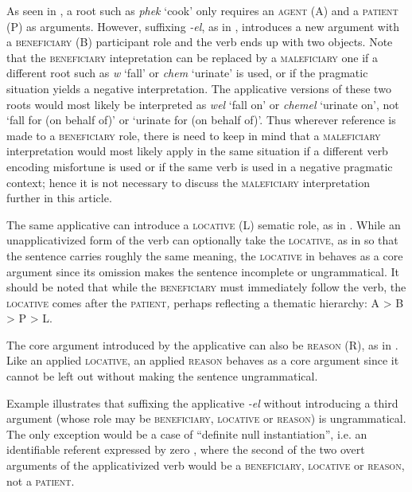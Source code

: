 \documentclass[output=paper]{langsci/langscibook}
\begin{document}
As seen in , a root such as \textit{phek} ‘cook’ only requires an \textsc{agent} (A) and a \textsc{patient} (P) as arguments. However, suffixing \textit{-el}, as in , introduces a new argument with a \textsc{beneficiary} (B) participant role and the verb ends up with two objects. Note that the \textsc{beneficiary} intepretation can be replaced by a \textsc{maleficiary} one if a different root such as \textit{w} ‘fall’ or \textit{chem} ‘urinate’ is used, or if the pragmatic situation yields a negative interpretation. The applicative versions of these two roots would most likely be interpreted as \textit{wel} ‘fall on’ or \textit{chemel} ‘urinate on’, not ‘fall for (on behalf of)’ or ‘urinate for (on behalf of)’. Thus wherever reference is made to a \textsc{beneficiary} role, there is need to keep in mind that a \textsc{maleficiary} interpretation would most likely apply in the same situation if a different verb encoding misfortune is used or if the same verb is used in a negative pragmatic context; hence it is not necessary to discuss the \textsc{maleficiary} interpretation further in this article. 

 The same applicative can introduce a \textsc{locative} (L) sematic role, as in . While an unapplicativized form of the verb can optionally take the \textsc{locative}, as in  so that the sentence carries roughly the same meaning, the \textsc{locative} in  behaves as a core argument since its omission makes the sentence incomplete or ungrammatical. It should be noted that while the \textsc{beneficiary} must immediately follow the verb, the \textsc{locative} comes after the \textsc{patient}\textit{,} perhaps reflecting a thematic hierarchy: A > B > P > L. 

 The core argument introduced by the applicative can also be \textsc{reason} (R), as in . Like an applied \textsc{locative}, an applied \textsc{reason} behaves as a core argument since it cannot be left out without making the sentence ungrammatical. 

 Example  illustrates that suffixing the applicative \textit{-el} without introducing a third argument (whose role may be \textsc{beneficiary}, \textsc{locative} or \textsc{reason}) is ungrammatical. The only exception would be a case of “definite null instantiation”, i.e. an identifiable referent expressed by zero \citep{Fillmore1986,FillmoreKay1999}, where the second of the two overt arguments of the applicativized verb would be a \textsc{beneficiary}, \textsc{locative} or \textsc{reason}, not a \textsc{patient}.
\end{document}

